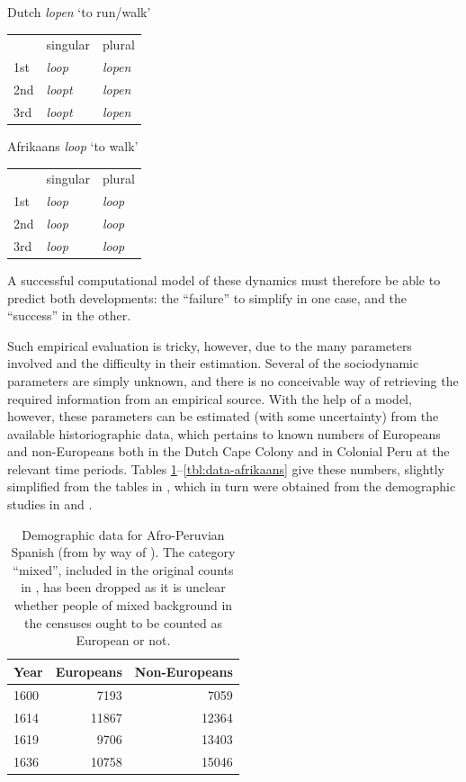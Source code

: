 \begin{exe}
\ex\label{ex:dutch} Dutch \emph{lopen} `to run/walk'

    \begin{tabular}{lll}
      & singular & plural \\
      1st & \emph{loop} & \emph{lopen} \\
      2nd & \emph{loopt} & \emph{lopen} \\
      3rd & \emph{loopt} & \emph{lopen}
    \end{tabular}
\ex\label{ex:afrikaans} Afrikaans \emph{loop} `to walk'

    \begin{tabular}{lll}
      & singular & plural \\
      1st & \emph{loop} & \emph{loop} \\
      2nd & \emph{loop} & \emph{loop} \\
      3rd & \emph{loop} & \emph{loop}
    \end{tabular}
\end{exe}

\noindent A successful computational model of these dynamics must
therefore be able to predict both developments: the ``failure'' to
simplify in one case, and the ``success'' in the other.

Such empirical evaluation is tricky, however, due to the many parameters
involved and the difficulty in their estimation. Several of the
sociodynamic parameters are simply unknown, and there is no conceivable
way of retrieving the required information from an empirical source.
With the help of a model, however, these parameters can be estimated
(with some uncertainty) from the available historiographic data, which
pertains to known numbers of Europeans and non-Europeans both in the
Dutch Cape Colony and in Colonial Peru at the relevant time periods.
Tables \ref{tbl:data-aps}--\ref{tbl:data-afrikaans} give these numbers,
slightly simplified from the tables in \textcite{Kauhanen2022}, which in
turn were obtained from the demographic studies in \textcite{Bow1974}
and \textcite{GilElph1979}.

\begin{table}
\caption{Demographic data for Afro-Peruvian Spanish (from \cite{Bow1974} by way of \cite{Kauhanen2022}). The category ``mixed'', included in the original counts in \textcite{Bow1974}, has been dropped as it is unclear whether people of mixed background in the censuses ought to be counted as European or not.}\label{tbl:data-aps}
\begin{tabular}{lrr}
\toprule
Year & Europeans & Non-Europeans\\
\midrule
1600 & 7193 & 7059\\
1614 & 11867 & 12364\\
1619 & 9706 & 13403\\
1636 & 10758 & 15046\\
\bottomrule
\end{tabular}
\end{table}

